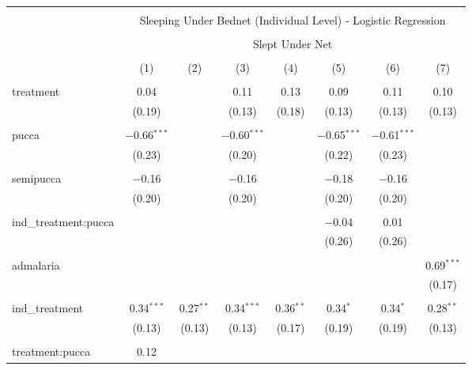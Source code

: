
\begin{table}[!htbp] \centering 
  \caption{} 
  \label{tbl:Sleeping Under Bednet (Individual Level) - Logistic Regression} 
\begin{tabular}{@{\extracolsep{5pt}}lccccccc} 
\\[-1.8ex]\hline 
\hline \\[-1.8ex] 
 & \multicolumn{7}{c}{Sleeping Under Bednet (Individual Level) - Logistic Regression} \\ 
\cline{2-8} 
\\[-1.8ex] & \multicolumn{7}{c}{Slept Under Net} \\ 
\\[-1.8ex] & (1) & (2) & (3) & (4) & (5) & (6) & (7)\\ 
\hline \\[-1.8ex] 
 treatment & 0.04 &  & 0.11 & 0.13 & 0.09 & 0.11 & 0.10 \\ 
  & (0.19) &  & (0.13) & (0.18) & (0.13) & (0.13) & (0.13) \\ 
  & & & & & & & \\ 
 pucca & $-$0.66$^{***}$ &  & $-$0.60$^{***}$ &  & $-$0.65$^{***}$ & $-$0.61$^{***}$ &  \\ 
  & (0.23) &  & (0.20) &  & (0.22) & (0.23) &  \\ 
  & & & & & & & \\ 
 semipucca & $-$0.16 &  & $-$0.16 &  & $-$0.18 & $-$0.16 &  \\ 
  & (0.20) &  & (0.20) &  & (0.20) & (0.20) &  \\ 
  & & & & & & & \\ 
 ind\_treatment:pucca &  &  &  &  & $-$0.04 & 0.01 &  \\ 
  &  &  &  &  & (0.26) & (0.26) &  \\ 
  & & & & & & & \\ 
 admalaria &  &  &  &  &  &  & 0.69$^{***}$ \\ 
  &  &  &  &  &  &  & (0.17) \\ 
  & & & & & & & \\ 
 ind\_treatment & 0.34$^{***}$ & 0.27$^{**}$ & 0.34$^{***}$ & 0.36$^{**}$ & 0.34$^{*}$ & 0.34$^{*}$ & 0.28$^{**}$ \\ 
  & (0.13) & (0.13) & (0.13) & (0.17) & (0.19) & (0.19) & (0.13) \\ 
  & & & & & & & \\ 
 treatment:pucca & 0.12 &  &  &  &  &  &  \\ 

\end{tabular}
\end{table}
